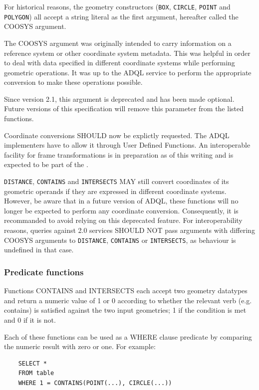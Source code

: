 \documentclass[11pt,a4paper]{ivoa}
\begin{document}
For historical reasons, the geometry constructors (\verb:BOX:, \verb:CIRCLE:,
\verb:POINT: and \verb:POLYGON:) all accept a string literal as the first
argument, hereafter called the COOSYS argument.

The COOSYS argument was originally intended to carry information on
a reference system or other coordinate system metadata. This was helpful in
order to deal with data specified in different coordinate systems while
performing geometric operations. It was up to the ADQL service to perform
the appropriate conversion to make these operations possible.

Since version 2.1, this argument is deprecated and has been made optional.
Future versions of this specification will remove this parameter from the listed
functions.

Coordinate conversions SHOULD now be explictly requested. The ADQL implementers
have to allow it through User Defined Functions. An interoperable facility for
frame transformations is in preparation as of this writing and is expected to be
part of the \CatalogueUDF{}.

\verb:DISTANCE:, \verb:CONTAINS: and \verb:INTERSECTS: MAY still convert
coordinates of its geometric operands if they are expressed in different
coordinate systems. However, be aware that in a future version of ADQL, these
functions will no longer be expected to perform any coordinate conversion.
Consequently, it is recommanded to avoid relying on this deprecated feature.
For interoperability reasons, queries against 2.0 services SHOULD NOT pass
arguments with differing COOSYS arguments to \verb:DISTANCE:, \verb:CONTAINS:
or \verb:INTERSECTS:, as behaviour is undefined in that case.

\subsubsection{Predicate functions}
\label{sec:functions.geom.predicate}

Functions CONTAINS and INTERSECTS each accept two geometry datatypes
and return a numeric value of 1 or 0 according to whether the relevant
verb (e.g. contains) is satisfied against the two input geometries;
1 if the condition is met and 0 if it is not.

Each of these functions can be used as a WHERE clause predicate by
comparing the numeric result with zero or one.
For example:
\begin{verbatim}
    SELECT *
    FROM table
    WHERE 1 = CONTAINS(POINT(...), CIRCLE(...))
\end{verbatim}
\end{document}
